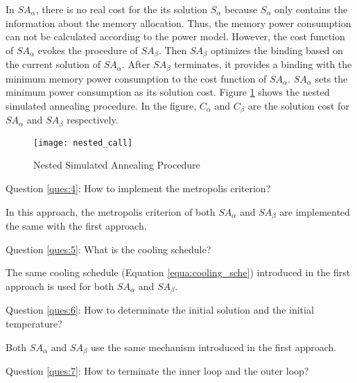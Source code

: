 		In $SA_{\alpha}$, there is no real cost for the its solution $S_{\alpha}$
		because $S_{\alpha}$ only contains the information about the memory allocation.
		Thus, the memory power consumption can not be calculated according to the
		power model.
		However, the cost function of $SA_{\alpha}$ evokes the procedure of $SA_{\beta}$.
		Then $SA_{\beta}$ optimizes the binding based on the current solution
		of $SA_{\alpha}$. After $SA_{\beta}$ terminates, it provides a binding with
		the minimum memory power consumption to the cost function of $SA_{\alpha}$.
		$SA_{\alpha}$ sets the minimum power consumption as its solution cost.
		Figure \ref{fig:nested_call} shows the nested simulated annealing procedure.
		In the figure, $C_{\alpha}$ and $C_{\beta}$ are the solution cost for $SA_{\alpha}$
		and $SA_{\beta}$ respectively.
		\begin{figure}[htb]
			\begin{center}
				\texttt{[image: nested\_call]}
				\caption{Nested Simulated Annealing Procedure}
				\label{fig:nested_call}
			\end{center}
		\end{figure}

		Question \ref{ques:4}: How to implement the metropolis criterion?

		In this approach, the metropolis criterion of both $SA_{\alpha}$ and
		$SA_{\beta}$ are implemented the same with the first approach.
		
		Question \ref{ques:5}: What is the cooling schedule?
		
		The same cooling schedule (Equation \ref{equa:cooling_sche}) introduced
		in the first approach is used for both $SA_{\alpha}$ and $SA_{\beta}$.
		
		Question \ref{ques:6}: How to determinate the initial solution and the
		initial temperature?
		
		Both $SA_{\alpha}$ and $SA_{\beta}$ use the same mechanism introduced in
		the first approach.
		
		Question \ref{ques:7}: How to terminate the inner loop and the outer loop?
	

